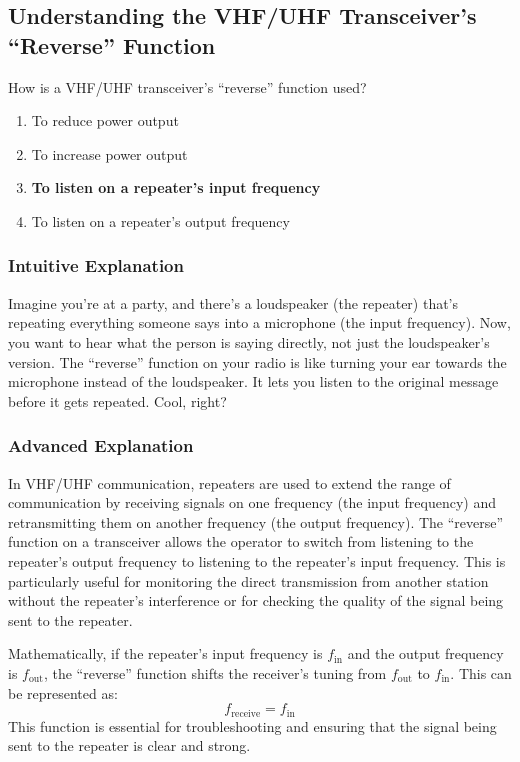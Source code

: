 \subsection{Understanding the VHF/UHF Transceiver’s “Reverse” Function}
\label{T2B01}

\begin{tcolorbox}[colback=gray!10!white,colframe=black!75!black,title=T2B01]
How is a VHF/UHF transceiver’s “reverse” function used?
\begin{enumerate}[label=\Alph*]
    \item To reduce power output
    \item To increase power output
    \item \textbf{To listen on a repeater’s input frequency}
    \item To listen on a repeater’s output frequency
\end{enumerate}
\end{tcolorbox}

\subsubsection{Intuitive Explanation}
Imagine you’re at a party, and there’s a loudspeaker (the repeater) that’s repeating everything someone says into a microphone (the input frequency). Now, you want to hear what the person is saying directly, not just the loudspeaker’s version. The “reverse” function on your radio is like turning your ear towards the microphone instead of the loudspeaker. It lets you listen to the original message before it gets repeated. Cool, right?

\subsubsection{Advanced Explanation}
In VHF/UHF communication, repeaters are used to extend the range of communication by receiving signals on one frequency (the input frequency) and retransmitting them on another frequency (the output frequency). The “reverse” function on a transceiver allows the operator to switch from listening to the repeater’s output frequency to listening to the repeater’s input frequency. This is particularly useful for monitoring the direct transmission from another station without the repeater’s interference or for checking the quality of the signal being sent to the repeater.

Mathematically, if the repeater’s input frequency is \( f_{\text{in}} \) and the output frequency is \( f_{\text{out}} \), the “reverse” function shifts the receiver’s tuning from \( f_{\text{out}} \) to \( f_{\text{in}} \). This can be represented as:
\[
f_{\text{receive}} = f_{\text{in}}
\]
This function is essential for troubleshooting and ensuring that the signal being sent to the repeater is clear and strong.

